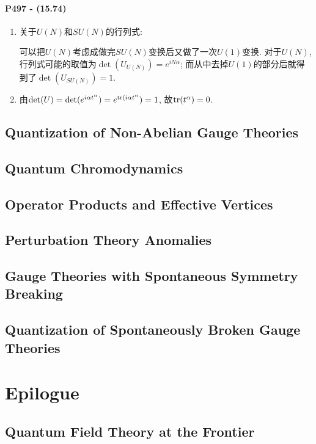 \documentclass[10pt,b5paper,openany]{book}
\begin{document}
\begin{center}
\end{center}

\subsection{P497 - (15.74)}

\begin{enumerate}
  \item 关于$U(N)$和$SU(N)$的行列式: 
  
  可以把$U(N)$考虑成做完$SU(N)$变换后又做了一次$U(1)$变换. 对于$U(N)$, 行列式可能的取值为$\det(U_{U(N)}) = e^{iN\alpha}$; 而从中去掉$U(1)$的部分后就得到了$\det(U_{SU(N)}) = 1$. 

  \item 由$\det(U) = \det(e^{i\alpha t^{\alpha}}) = e^{{\rm tr}(i\alpha t^{\alpha}}) = 1$, 故${\rm tr}(t^{\alpha}) = 0$. 
\end{enumerate}

\subsection{}

\clearpage

\chapter{Quantization of Non-Abelian Gauge Theories}

\chapter{Quantum Chromodynamics}

\chapter{Operator Products and Effective Vertices}

\chapter{Perturbation Theory Anomalies}

\chapter{Gauge Theories with Spontaneous Symmetry Breaking}

\chapter{Quantization of Spontaneously Broken Gauge Theories}

\clearpage %
\part*{Epilogue} %

\chapter{Quantum Field Theory at the Frontier}
\end{document}
